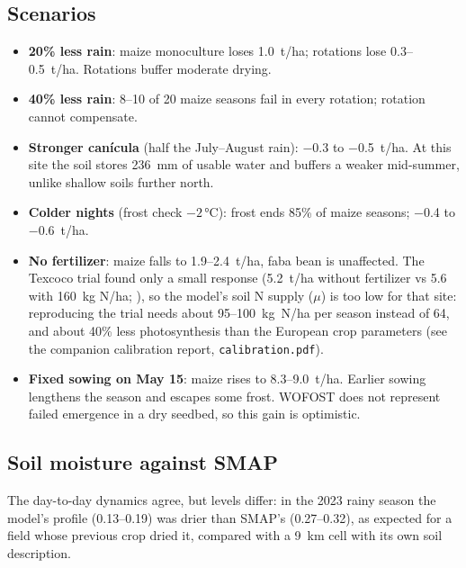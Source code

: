 \documentclass[11pt,a4paper]{article}
\begin{document}
\subsection{Scenarios}


\begin{itemize}[nosep]
  \item \textbf{20\% less rain}: maize monoculture loses 1.0~t/ha; rotations lose 0.3--0.5~t/ha. Rotations buffer
        moderate drying.
  \item \textbf{40\% less rain}: 8--10 of 20 maize seasons fail in every rotation; rotation cannot compensate.
  \item \textbf{Stronger canícula} (half the July--August rain): $-$0.3 to $-$0.5~t/ha. At this site the soil
        stores 236~mm of usable water and buffers a weaker mid-summer, unlike shallow soils further north.
  \item \textbf{Colder nights} (frost check $-2$\,°C): frost ends 85\% of maize seasons; $-$0.4 to $-$0.6~t/ha.
  \item \textbf{No fertilizer}: maize falls to 1.9--2.4~t/ha, faba bean is unaffected. The Texcoco trial found only
        a small response (5.2~t/ha without fertilizer vs 5.6 with 160~kg N/ha; \citealp{alonso2023terra}), so the
        model's soil N supply (\(\mu\)) is too low for that site: reproducing the trial needs about 95--100~kg~N/ha
        per season instead of 64, and about 40\% less photosynthesis than the European crop parameters (see the
        companion calibration report, \texttt{calibration.pdf}).
  \item \textbf{Fixed sowing on May 15}: maize rises to 8.3--9.0~t/ha. Earlier sowing lengthens the season and
        escapes some frost. WOFOST does not represent failed emergence in a dry seedbed, so this gain is optimistic.
\end{itemize}

\subsection{Soil moisture against SMAP}
The day-to-day dynamics agree, but levels differ: in the 2023 rainy season the model's profile (0.13--0.19) was drier
than SMAP's (0.27--0.32), as expected for a field whose previous crop dried it, compared with a 9~km cell with its own
soil description.
\end{document}
